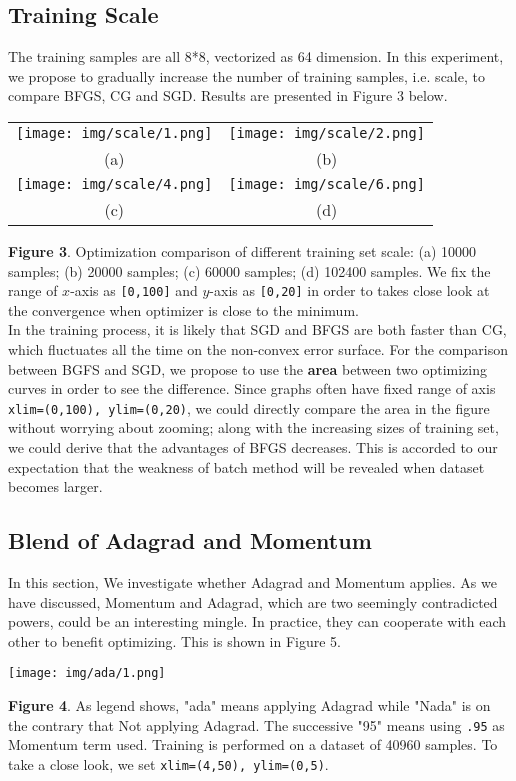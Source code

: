 \documentclass{article} %
\begin{document}
\subsection{Training Scale}
The training samples are all 8*8, vectorized as 64 dimension. In this experiment, we propose to gradually increase the number of training samples, i.e. scale, to compare BFGS, CG and SGD. Results are presented in Figure 3 below. \\
    \begin{tabular}{cc}
    \texttt{[image: img/scale/1.png]}  & \texttt{[image: img/scale/2.png]} \\
    (a) & (b) \\
    \texttt{[image: img/scale/4.png]}  & \texttt{[image: img/scale/6.png]} \\
    (c) & (d) \\
    \end{tabular}
    {\bf Figure 3}. Optimization comparison of different training set scale: (a) 10000 samples; (b) 20000 samples; (c) 60000 samples; (d) 102400 samples. We fix the range of $x$-axis as \texttt{[0,100]} and $y$-axis as \texttt{[0,20]} in order to takes close look at the convergence when optimizer is close to the minimum. \\
    
In the training process, it is likely that SGD and BFGS are both faster than CG, which fluctuates all the time on the non-convex error surface. For the comparison between BGFS and SGD, we propose to use the \textbf{area} between two optimizing curves in order to see the difference. Since graphs often have fixed range of axis \texttt{xlim=(0,100), ylim=(0,20)}, we could directly compare the area in the figure without worrying about zooming; along with the increasing sizes of training set, we could derive that the advantages of BFGS decreases. This is accorded to our expectation that the weakness of batch method will be revealed when dataset becomes larger.

\subsection{Blend of Adagrad and Momentum}
In this section, We investigate whether Adagrad and Momentum applies. As we have discussed, Momentum and Adagrad, which are two seemingly contradicted powers, could be an interesting mingle. In practice, they can cooperate with each other to benefit optimizing. This is shown in Figure 5.\\
\begin{center}
\texttt{[image: img/ada/1.png]} 
\end{center}
{\bf Figure 4}. As legend shows, "ada" means applying Adagrad while "Nada" is on the contrary that Not applying Adagrad. The successive "95" means using \texttt{.95} as Momentum term used. Training is performed on a dataset of 40960 samples. To take a close look, we set \texttt{xlim=(4,50), ylim=(0,5)}.\\
\end{document}
